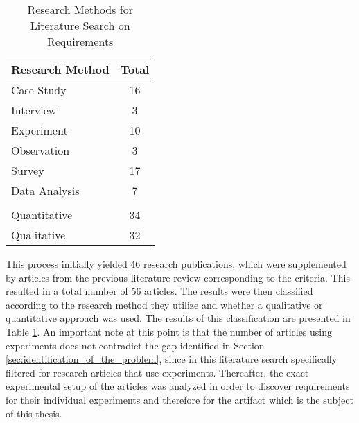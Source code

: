 \begin{table}[htbp]
    \centering
    \small
    \begin{tabular}{ll}
    \hline
    \multicolumn{1}{l}{Research Method} & \multicolumn{1}{l}{Total} \\ \hline
    \multicolumn{1}{l}{Case  Study}     & \multicolumn{1}{c}{16}    \\ 
    \multicolumn{1}{l}{Interview}       & \multicolumn{1}{c}{3}     \\ 
    \multicolumn{1}{l}{Experiment}      & \multicolumn{1}{c}{10}    \\ 
    \multicolumn{1}{l}{Observation}     & \multicolumn{1}{c}{3}     \\ 
    \multicolumn{1}{l}{Survey}          & \multicolumn{1}{c}{17}    \\ 
    \multicolumn{1}{l}{Data Analysis}   & \multicolumn{1}{c}{7}     \\ 
                                            &                            \\ \hline
    \multicolumn{1}{l}{Quantitative}    & \multicolumn{1}{c}{34}    \\ 
    \multicolumn{1}{l}{Qualitative}     & \multicolumn{1}{c}{32}    \\ \hline
    \end{tabular}
    \caption[Research Methods for Literature Search on Requirements]{Research Methods for Literature Search on Requirements}\label{tab:secondLiteratureSearch}
    \end{table}

This process initially yielded 46 research publications, which were supplemented by articles from the previous literature review corresponding to the criteria. This resulted in a total number of 56 articles. The results were then classified according to the research method they utilize and whether a qualitative or quantitative approach was used. The results of this classification are presented in Table \ref{tab:secondLiteratureSearch}. An important note at this point is that the number of articles using experiments does not contradict the gap identified in Section \ref{sec:identification_of_the_problem}, since in this literature search specifically filtered for research articles that use experiments. Thereafter, the exact experimental setup of the articles was analyzed in order to discover requirements for their individual experiments and therefore for the artifact which is the subject of this thesis.




